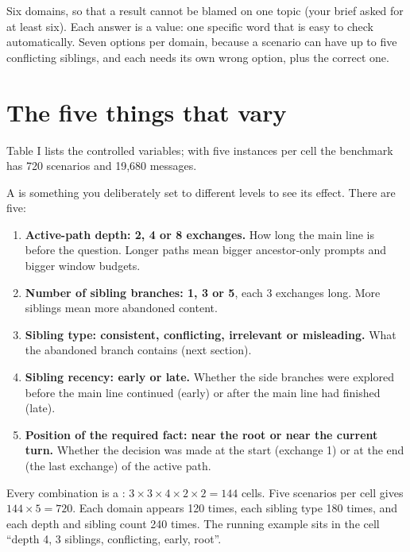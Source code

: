 \begin{why}
Six domains, so that a result cannot be blamed on one topic (your brief asked for at least six). Each answer is a  value: one specific word that is easy to check automatically. Seven options per domain, because a scenario can have up to five conflicting siblings, and each needs its own wrong option, plus the correct one.
\end{why}

\section{The five things that vary}

\begin{paper}
Table I lists the controlled variables; with five instances per cell the benchmark has 720 scenarios and 19,680 messages.
\end{paper}

A  is something you deliberately set to different levels to see its effect. There are five:

\begin{enumerate}
\item \textbf{Active-path depth: 2, 4 or 8 exchanges.} How long the main line is before the question. Longer paths mean bigger ancestor-only prompts and bigger window budgets.
\item \textbf{Number of sibling branches: 1, 3 or 5}, each 3 exchanges long. More siblings mean more abandoned content.
\item \textbf{Sibling type: consistent, conflicting, irrelevant or misleading.} What the abandoned branch contains (next section).
\item \textbf{Sibling recency: early or late.} Whether the side branches were explored before the main line continued (early) or after the main line had finished (late).
\item \textbf{Position of the required fact: near the root or near the current turn.} Whether the decision was made at the start (exchange 1) or at the end (the last exchange) of the active path.
\end{enumerate}

\begin{example}
Every combination is a : $3 \times 3 \times 4 \times 2 \times 2 = 144$ cells. Five scenarios per cell gives $144 \times 5 = 720$. Each domain appears 120 times, each sibling type 180 times, and each depth and sibling count 240 times. The running example sits in the cell ``depth 4, 3 siblings, conflicting, early, root''.
\end{example}

